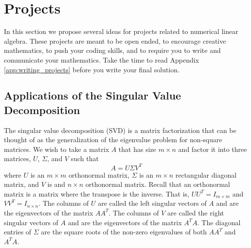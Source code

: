 




\newpage\section{Projects}
In this section we propose several ideas for projects related to numerical linear algebra.
These projects are meant to be open ended, to encourage creative mathematics, to push your
coding skills, and to require you to write and communicate your mathematics.  Take the
time to read Appendix \ref{app:writing_projects} before you write your final solution.

\subsection{Applications of the Singular Value Decomposition}
The singular value decomposition (SVD) is a matrix factorization that can be thought of as
the generalization of the eigenvalue problem for non-square matrices.  We wish to take a
matrix $A$ that has size $m \times n$ and factor it into three matrices, $U$, $\Sigma$,
and $V$ such that 
\[ A = U \Sigma V^T \]
where $U$ is an $m \times m$ orthonormal matrix, $\Sigma$ is an $m \times n$ rectangular
diagonal matrix, and $V$ is and $n \times n$ orthonormal matrix.  Recall that an
orthonormal matrix
is a matrix where the transpose is the inverse.  That is, $UU^T = I_{m \times m}$ and $VV^T
= I_{n \times n}$. The columns of $U$ are called the left singular vectors of $A$ and are
the eigenvectors of the matrix $AA^T$.  The columns of $V$ are called the right singular
vectors of $A$ and are the eigenvectors of the matrix $A^TA$.  The diagonal entries of
$\Sigma$ are the square roots of the non-zero eigenvalues of both $AA^T$ and $A^TA$.

